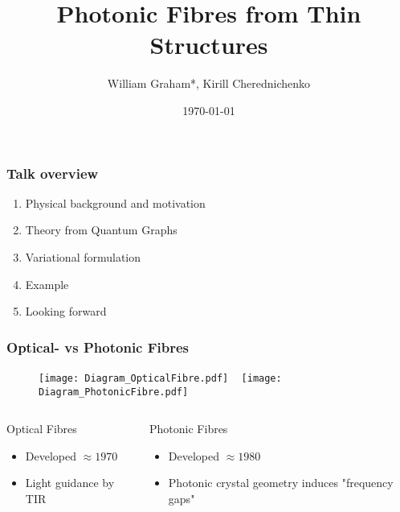 \documentclass{beamer}
\title{Photonic Fibres from Thin Structures}
\author{William Graham*, Kirill Cherednichenko}
\institute{University of Bath}
\date{\today}
\begin{document}
 
\frame{\titlepage}
 
\begin{frame}
	\frametitle{Talk overview}
	
	\begin{enumerate}
		\item Physical background and motivation
		\item Theory from Quantum Graphs
		\item Variational formulation
		\item Example
		\item Looking forward
	\end{enumerate}
\end{frame}

\begin{frame}
	\frametitle{Optical- vs Photonic Fibres}
	
	\begin{figure}[t]
		\centering
		\texttt{[image: Diagram\_OpticalFibre.pdf]}
		~
		\texttt{[image: Diagram\_PhotonicFibre.pdf]}
	\end{figure}
	\begin{columns}
		\begin{column}{0.45\textwidth}
			\begin{block}{Optical Fibres}
				\begin{itemize}
					\item Developed $\approx 1970$
					\item Light guidance by TIR
				\end{itemize}
			\end{block}
		\end{column}
		\begin{column}{0.45\textwidth}
			\begin{block}{Photonic Fibres}
				\begin{itemize}
					\item Developed $\approx 1980$
					\item Photonic crystal geometry induces "frequency gaps"
				\end{itemize}
			\end{block}
		\end{column}
	\end{columns}
\end{frame} 
\end{document}
